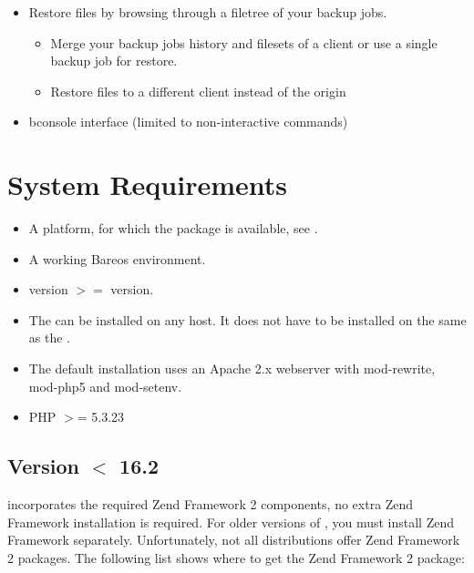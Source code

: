 \begin{itemize}
\begin{itemize}
    \end{itemize}
\item Restore files by browsing through a filetree of your backup jobs.
    \begin{itemize}
    \item Merge your backup jobs history and filesets of a client or use a single backup job for restore.
    \item Restore files to a different client instead of the origin
    \end{itemize}
\item bconsole interface (limited to non-interactive commands)
\end{itemize}

\section{System Requirements}

\begin{itemize}
\item A platform, for which the  package is available, see .
\item A working Bareos environment.
\item \bareosDir version $>=$ \bareosWebui version.
\item The \bareosWebui can be installed on any host. It does not have to be installed on the same as the \bareosDir.
\item The default installation uses an Apache 2.x webserver with mod-rewrite, mod-php5 and mod-setenv.
\item PHP $>$= 5.3.23
\end{itemize}

\subsection{Version $<$ 16.2}

\bareosWebui {} incorporates the required Zend Framework 2 components, no extra Zend Framework installation is required.
For older versions of , you must install Zend Framework separately.
Unfortunately, not all distributions offer Zend Framework 2 packages.
The following list shows where to get the Zend Framework 2 package:

